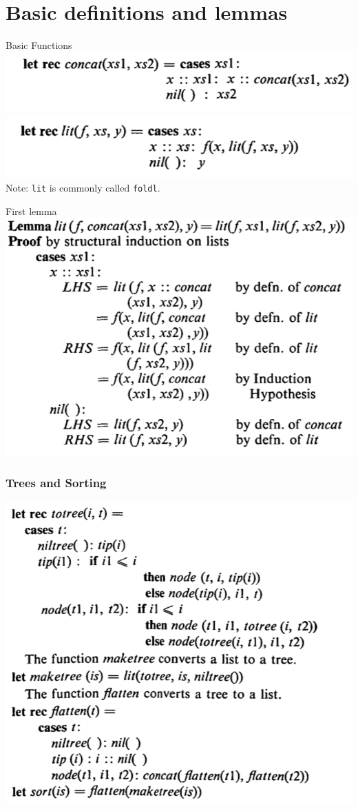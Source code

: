 \documentclass{beamer}
\newcommand{\code}[1]{\texttt{#1}}
\begin{document}
\section{Basic definitions and lemmas}
\begin{frame}
  \begin{block}{Basic Functions}
    {\center \includegraphics[width=.5\textwidth]{./concat.png}\\
      \includegraphics[width=.5\textwidth]{./lit.png}\\}
    Note: \code{lit} is commonly called \code{foldl}.
  \end{block}
  \pause
  \begin{block}{First lemma}
    \center\includegraphics[width=.5\textwidth]{./lit-concat-lemma.png}\\
  \end{block}
\end{frame} 

\begin{frame}
  \frametitle{Trees and Sorting}
  {\center \includegraphics[width=.5\textwidth]{./tree-fns.png}\\}
\end{frame} 
\end{document}
